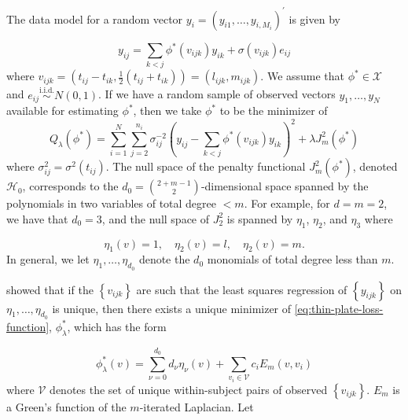 \documentclass[12pt]{article}
\theoremstyle{definition}
\begin{document}
\bigskip
The data model for a random vector $y_i = \left(y_{i1},\dots, y_{i,M_i} \right)^\prime$ is given by 

\begin{equation} \label{eq:functional-vc-ar-model}
y_{ij} = \sum_{k<j} \phi^*\left(v_{ijk}\right) y_{ik} + \sigma\left(v_{ijk}\right) e_{ij}
\end{equation}
\noindent
where $v_{ijk} = \left(t_{ij}-t_{ik}, \frac{1}{2}\left(t_{ij}+t_{ik}\right)\right) = \left(l_{ijk}, m_{ijk}\right)$. We assume that $\phi^* \in \mathcal{X}$ and $e_{ij} \stackrel{\text{i.i.d.}}{\sim} N\left(0,1\right)$. If we have a random sample of observed vectors $y_1,\dots,y_N$ available for estimating $\phi^*$, then we take $\phi^*$ to be the minimizer of
\begin{equation} \label{eq:thin-plate-loss-function}
Q_\lambda \left( \phi^* \right) = \sum_{i=1}^N \sum_{j=2}^{n_i} \sigma^{-2}_{ij}\left( y_{ij} - \sum_{k<j} \phi^*\left(v_{ijk}\right) y_{ik}  \right)^2 + \lambda J_m^2 \left( \phi^* \right)
\end{equation}
\noindent
where $\sigma^{2}_{ij} = \sigma^2\left(t_{ij}\right)$. The null space of the penalty functional $J_m^2 \left( \phi^* \right)$, denoted $\mathcal{H}_0$, corresponds to the $d_0={2+m-1 \choose 2}$-dimensional space spanned by the polynomials in two variables of total degree $< m$. For example, for $d=m=2$, we have that $d_0=3$, and the null space of $J^2_2$ is spanned by $\eta_1$, $\eta_2$, and $\eta_3$ where

\[
\eta_1\left(v\right) = 1,\quad \eta_2\left(v\right) = l, \quad \eta_2\left(v\right) = m.
\]
\noindent
In general, we let $\eta_1,\dots, \eta_{d_0}$ denote the $d_0$ monomials of total degree less than $m$.

\bigskip

\citet{duchon1977splines} showed that if the $\left\{ v_{ijk} \right\}$ are such that the least squares regression of $\left\{ y_{ijk}\right\}$ on $\eta_1,\dots, \eta_{d_0}$ is unique, then there exists a unique minimizer of \ref{eq:thin-plate-loss-function}, $\phi^*_\lambda$, which has the form

\begin{equation} \label{eq:unique-minimizer-of-loss}
\phi^*_\lambda\left( v \right) = \sum_{\nu=0}^{d_0} d_\nu \eta_\nu \left( v \right) + \sum_{v_i \in \mathcal{V}} c_{i} E_m\left(v,v_i \right)
\end{equation}
\noindent
where $\mathcal{V}$ denotes the set of unique within-subject pairs of observed $\left\{ v_{ijk} \right\}$. $E_m$ is a Green's function of the $m$-iterated Laplacian. Let
\end{document}
